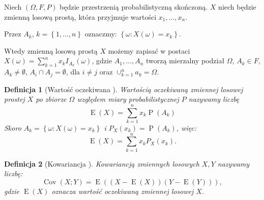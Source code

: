 \documentclass[12pt,a4paper]{report}
\newtheorem{df}{Definicja}[chapter]
\newcommand{\set}[1]{\left\lbrace {#1} \right\rbrace}
\newcommand{\Covariance}[2]{\operatorname{Cov}\left({#1}; {#2} \right)}
\newcommand{\e}[1]{\operatorname{E}\left({#1} \right)}
\newcommand{\p}[1]{\operatorname{P}\left({#1} \right)}
\begin{document}
Niech $(\Omega,F,P)$ będzie przestrzenią probabilistyczną skończoną. $X$ niech będzie zmienną losową prostą, która przyjmuje wartości $x_1, \ldots, x_n$. 

Przez $A_k$, $k=\set{1, \ldots, n}$ oznaczmy: $\set{\omega : X(\omega) = x_k}$.

Wtedy zmienną losową prostą $X$ możemy zapisać w postaci $X(\omega) = \sum_{k=1}^n x_k I_{A_k}(\omega)$, gdzie $A_1, \ldots, A_n$ tworzą mierzalny podział $\Omega$, $A_k \in F$, $A_k \neq \emptyset$, $A_i \cap A_j = \emptyset$, dla $i \neq j$ oraz $\cup_{k=1}^n a_k = \Omega$.

\begin{df}[Wartość oczekiwana {\citep[Sec 2.7 Def.2.21]{wztp}}]
Wartością oczekiwaną zmiennej losowej prostej $X$ po zbiorze $\Omega$ względem miary probabilistycznej $P$ nazywamy liczbę
$$
\e{X} = \sum_{k=1}^n x_k \p{A_k}
$$
Skoro $A_k = \set{\omega : X(\omega) = x_k}$ i $P_X(x_k) = \p{A_k}$, więc:
$$
\e{X} = \sum_{k=1}^n x_k P_X(x_k).
$$
\end{df}
\begin{df}[Kowariancja {\citep[Sec 2.8 Def.2.32]{wztp}}]
Kowariancją zmiennych losowych $X,Y$ nazywamy liczbę:
$$
\Covariance{X}{Y} = \e{(X-\e{X})(Y-\e{Y})},
$$
gdzie $\e{X}$ oznacza wartość oczekiwaną zmiennej losowej $X$.
\end{df}
\end{document}

